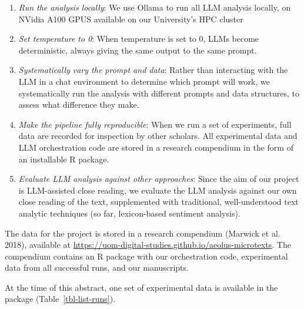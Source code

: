 \documentclass[
  letterpaper,
  DIV=11,
  numbers=noendperiod]{scrartcl}
\providecommand{\tightlist}{%
  \setlength{\itemsep}{0pt}\setlength{\parskip}{0pt}}
\begin{document}
\begin{enumerate}
\def\labelenumi{\arabic{enumi}.}
\tightlist
\item
  \emph{Run the analysis locally}: We use Ollama to run all LLM analysis
  locally, on NVidia A100 GPUS available on our University's HPC cluster
\item
  \emph{Set temperature to 0}: When temperature is set to 0, LLMs become
  deterministic, always giving the same output to the same prompt.
\item
  \emph{Systematically vary the prompt and data}: Rather than
  interacting with the LLM in a chat environment to determine which
  prompt will work, we systematically run the analysis with different
  prompts and data structures, to assess what difference they make.
\item
  \emph{Make the pipeline fully reproducible}: When we run a set of
  experiments, full data are recorded for inspection by other scholars.
  All experimental data and LLM orchestration code are stored in a
  research compendium in the form of an installable R package.
\item
  \emph{Evaluate LLM analysis against other approaches}: Since the aim
  of our project is LLM-assisted close reading, we evaluate the LLM
  analysis against our own close reading of the text, supplemented with
  traditional, well-understood text analytic techniques (so far,
  lexicon-based sentiment analysis).
\end{enumerate}

The data for the project is stored in a research compendium (Marwick et
al. 2018), available at
\url{https://uom-digital-studies.github.io/aeolus-microtexts}. The
compendium contains an R package with our orchestration code,
experimental data from all successful runs, and our manuscripts.

At the time of this abstract, one set of experimental data is available
in the package (Table~\ref{tbl-list-runs}).
\end{document}

